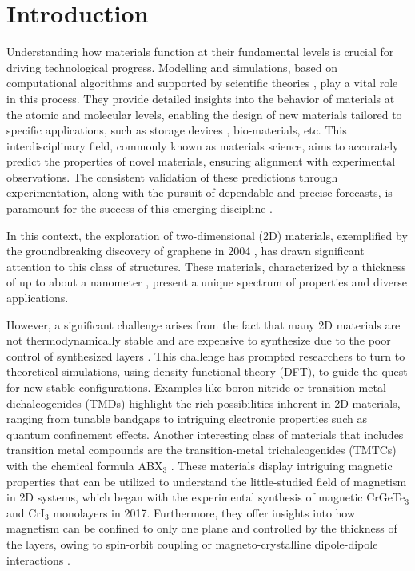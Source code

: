 
\chapter{Introduction} %

\label{Chapter1} %


Understanding how materials function at their fundamental levels is crucial for driving technological progress. Modelling and simulations, based on computational algorithms and supported by scientific theories \supercite{Xiao2007,Lee2011}, play a vital role in this process. They provide detailed insights into the behavior of materials at the atomic and molecular levels, enabling the design of new materials tailored to specific applications, such as storage devices \supercite{Anurag2021}, bio-materials, etc. This interdisciplinary field, commonly known as materials science, aims to accurately predict the properties of novel materials, ensuring alignment with experimental observations. The consistent validation of these predictions through experimentation, along with the pursuit of dependable and precise forecasts, is paramount for the success of this emerging discipline \supercite{Giustino2014}.

In this context, the exploration of two-dimensional (2D) materials, exemplified by the groundbreaking discovery of graphene in 2004 \supercite{Novoselov2004}, has drawn significant attention to this class of structures. These materials, characterized by a thickness of up to about a nanometer \supercite{Paul2017}, present a unique spectrum of properties and diverse applications.

However, a significant challenge arises from the fact that many 2D materials are not thermodynamically stable and are expensive to synthesize due to the poor control of synthesized layers \supercite{Choi2022}. This challenge has prompted researchers to turn to theoretical simulations, using density functional theory (DFT), to guide the quest for new stable configurations.  Examples like boron nitride \supercite{Cassabois2016} or transition metal dichalcogenides (TMDs) \supercite{Splendiani2010} highlight the rich possibilities inherent in 2D materials, ranging from tunable bandgaps\supercite{Ramasubramaniam2011} to intriguing electronic properties such as quantum confinement effects\supercite{Ding2019}. Another interesting class of materials that includes transition metal compounds are the transition-metal trichalcogenides (TMTCs) with the chemical formula ABX$_3$ \supercite{Sivadas2015}. These materials display intriguing magnetic properties that can be utilized to understand the little-studied field of magnetism in 2D systems, which began with the experimental synthesis of magnetic CrGeTe$_3$\supercite{Gong2017} and CrI$_3$\supercite{Huang2017} monolayers in 2017. Furthermore, they offer insights into how magnetism can be confined to only one plane and controlled by the thickness of the layers, owing to spin-orbit coupling or magneto-crystalline dipole-dipole interactions \supercite{Gibertini2019}.


